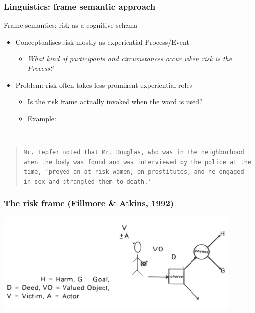 \documentclass{beamer}       %
\begin{document}
\begin{frame}
    \frametitle{Linguistics: frame semantic approach}

    Frame semantics: risk as a cognitive schema \cite{fillmore_toward_1992}

\begin{itemize}
    \item Conceptualises risk mostly as experiential Process\slash Event
    \begin{itemize}
        \item \emph{What kind of participants and circumstances occur when risk is the Process?}
    \end{itemize}
    \item Problem: risk often takes less prominent experiential roles
    \begin{itemize}
        \item Is the risk frame actually invoked when the word is used?
        \item Example:
    \end{itemize}
    \end{itemize}

    ~\\
    \footnotesize
    \begin{quote}
    \noindent
    \texttt{Mr. Tepfer noted that Mr. Douglas, who was in the neighborhood when the body was found and was interviewed by the police at the time, `preyed on \textbf{at-risk women}, on prostitutes, and he engaged in sex and strangled them to death.' }
    \end{quote}

\end{frame}

\begin{frame}
    \frametitle{The risk frame (Fillmore \& Atkins, 1992)}
    \centering
    \includegraphics[width=0.90\textwidth]{../../images/riskframe.png}
\end{frame}
\end{document}
